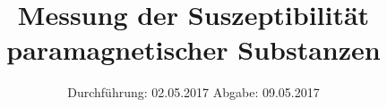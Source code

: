 


\subject{V606}
\title{Messung der Suszeptibilität paramagnetischer Substanzen}
\date{
	Durchführung: 02.05.2017
	\hspace{4em}
	Abgabe: 09.05.2017
}


	\maketitle
	\newpage
	\tableofcontents
	\newpage
	
	
	
	
	
	
	\newpage
	
	\printbibliography

